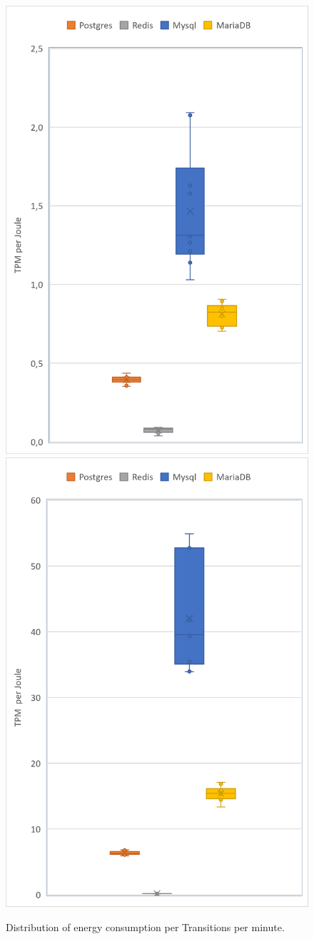 \begin{figure}[h!]
\centering
\caption{Distribution of energy consumption per Transitions per minute.}
\includegraphics[width=0.6\columnwidth]{results/boxplot/Packgage-tpm.png}
\includegraphics[width=0.6\columnwidth]{results/boxplot/total-tpm.png}

\end{figure}
